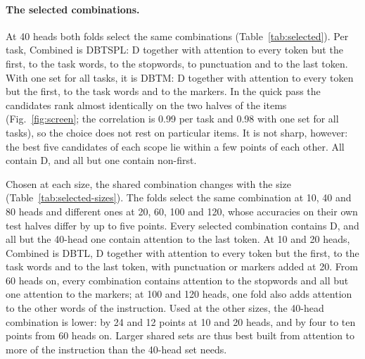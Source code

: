 \documentclass[10pt,a4paper]{article}
\begin{document}
\begin{table}[tbp]
\centering\small

\caption{Shared Combined at every size. Fold~1, Fold~2: the combination each fold selects at that size and its accuracy on the fold's own test half (mean over the 14 tasks, $\alpha$ cross-fitted as for every rule). Task, Control, Random: means of the two folds with the task's own means, the related task's means and the random sets.}
\label{tab:selected-sizes}
\end{table}

\paragraph{The selected combinations.} At 40 heads both folds select the same combinations (Table~\ref{tab:selected}). Per task, Combined is DBTSPL: D together with attention to every token but the first, to the task words, to the stopwords, to punctuation and to the last token. With one set for all tasks, it is DBTM: D together with attention to every token but the first, to the task words and to the markers. In the quick pass the candidates rank almost identically on the two halves of the items (Fig.~\ref{fig:screen}; the correlation is 0.99 per task and 0.98 with one set for all tasks), so the choice does not rest on particular items. It is not sharp, however: the best five candidates of each scope lie within a few points of each other. All contain D, and all but one contain non-first.

Chosen at each size, the shared combination changes with the size (Table~\ref{tab:selected-sizes}). The folds select the same combination at 10, 40 and 80 heads and different ones at 20, 60, 100 and 120, whose accuracies on their own test halves differ by up to five points. Every selected combination contains D, and all but the 40-head one contain attention to the last token. At 10 and 20 heads, Combined is DBTL, D together with attention to every token but the first, to the task words and to the last token, with punctuation or markers added at 20. From 60 heads on, every combination contains attention to the stopwords and all but one attention to the markers; at 100 and 120 heads, one fold also adds attention to the other words of the instruction. Used at the other sizes, the 40-head combination is lower: by 24 and 12 points at 10 and 20 heads, and by four to ten points from 60 heads on. Larger shared sets are thus best built from attention to more of the instruction than the 40-head set needs.
\end{document}
